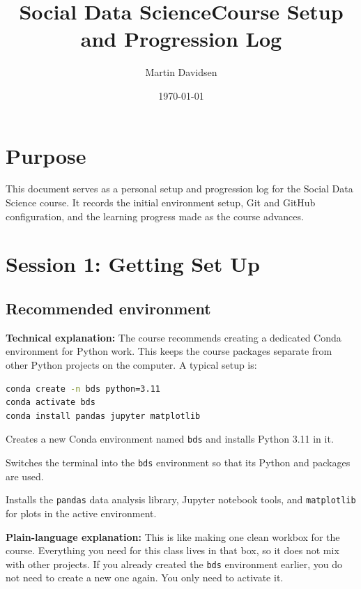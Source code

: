 \documentclass[11pt,a4paper]{article}
\title{Social Data Science\newline Course Setup and Progression Log}
\author{Martin Davidsen}
\date{\today}
\begin{document}
\maketitle

\section*{Purpose}
This document serves as a personal setup and progression log for the Social Data Science course. It records the initial environment setup, Git and GitHub configuration, and the learning progress made as the course advances.

\section{Session 1: Getting Set Up}

\subsection{Recommended environment}
\textbf{Technical explanation:} The course recommends creating a dedicated Conda environment for Python work. This keeps the course packages separate from other Python projects on the computer. A typical setup is:

\begin{lstlisting}[language=bash]
conda create -n bds python=3.11
conda activate bds
conda install pandas jupyter matplotlib
\end{lstlisting}

\begin{description}[leftmargin=2.8cm,style=multiline]
    \item[\texttt{conda create}] Creates a new Conda environment named \texttt{bds} and installs Python 3.11 in it.
    \item[\texttt{conda activate}] Switches the terminal into the \texttt{bds} environment so that its Python and packages are used.
    \item[\texttt{conda install}] Installs the \texttt{pandas} data analysis library, Jupyter notebook tools, and \texttt{matplotlib} for plots in the active environment.
\end{description}

\textbf{Plain-language explanation:} This is like making one clean workbox for the course. Everything you need for this class lives in that box, so it does not mix with other projects. If you already created the \texttt{bds} environment earlier, you do not need to create a new one again. You only need to activate it.
\end{document}
